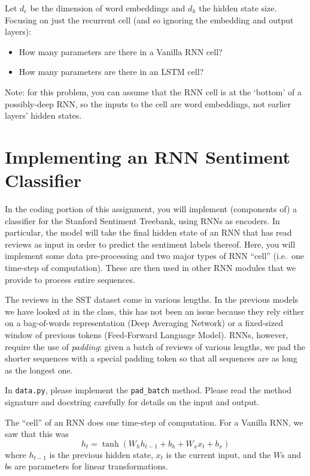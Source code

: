 \documentclass[11pt]{article}
\begin{document}
\vspace{2em}
  Let $d_e$ be the dimension of word embeddings and $d_h$ the hidden state size.  Focusing on just the recurrent cell (and so ignoring the embedding and output layers):
\begin{itemize}
  \item How many parameters are there in a Vanilla RNN cell?
  \item How many parameters are there in an LSTM cell?
\end{itemize}
Note: for this problem, you can assume that the RNN cell is at the `bottom' of a possibly-deep RNN, so the inputs to the cell are word embeddings, not earlier layers' hidden states.


\section{Implementing an RNN Sentiment Classifier}

In the coding portion of this assignment, you will implement (components of) a classifier for the Stanford Sentiment Treebank, using RNNs as encoders.  In particular, the model will take the final hidden state of an RNN that has read reviews as input in order to predict the sentiment labels thereof.  Here, you will implement some data pre-processing and two major types of RNN ``cell'' (i.e.\ one time-step of computation).  These are then used in other RNN modules that we provide to process entire sequences.

\vspace{2em}
 The reviews in the SST dataset come in various lengths.  In the previous models we have looked at in the class, this has not been an issue because they rely either on a bag-of-words representation (Deep Averaging Network) or a fixed-sized window of previous tokens (Feed-Forward Language Model).  RNNs, however, require the use of \emph{padding}: given a batch of reviews of various lengths, we pad the shorter sequences with a special padding token so that all sequences are as long as the longest one.

\noindent In \texttt{data.py}, please implement the \texttt{pad\_batch} method.  Please read the method signature and docstring carefully for details on the input and output.


\vspace{2em}
 The ``cell'' of an RNN does one time-step of computation.  For a Vanilla RNN, we saw that this was
\[ h_t = \tanh\left( W_h h_{t-1} + b_h + W_x x_t + b_x \right) \]
where $h_{t-1}$ is the previous hidden state, $x_t$ is the current input, and the $W$s and $b$s are parameters for linear transformations.
\end{document}
